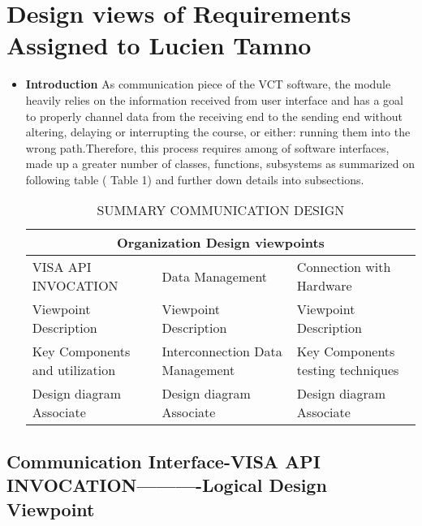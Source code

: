 \documentclass [10pt]{article}
\begin{document}
\section{\textbf{Design views of Requirements Assigned to Lucien Tamno}}
\begin{itemize}
\item \textbf{Introduction}
As communication piece of the VCT software, the module heavily relies on the information received from user interface and has a goal to properly channel data from the receiving end  to the sending end without altering, delaying or interrupting the course, or either: running them into the wrong path.Therefore, this process requires among of software interfaces, made up a greater number of classes, functions, subsystems as summarized on following table ( Table 1) and further down details into subsections.\par
\begin{table}[h]
\begin{center}
\begin{tabular}{|p{3cm}|p{3cm}|p{3cm}| } 
\hline
\multicolumn{3}{|c|}{Organization Design viewpoints} \\
\hline
VISA API INVOCATION & Data Management & Connection with Hardware \\
\hline
Viewpoint Description & Viewpoint Description & Viewpoint Description \\
\hline
Key Components and utilization & Interconnection Data Management & Key Components  testing techniques \\
\hline
 Design  diagram Associate & Design  diagram Associate &  Design  diagram Associate \\
\hline
\end{tabular}
\caption{ SUMMARY COMMUNICATION DESIGN}
\end{center}
\end{table}
\end{itemize}


\subsection{\textbf{Communication Interface-VISA API INVOCATION----------Logical Design Viewpoint }}
\end{document}
